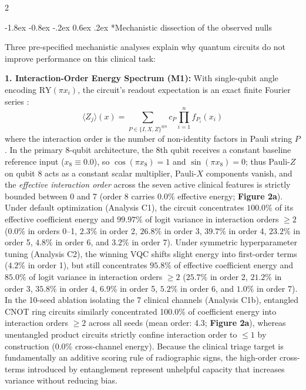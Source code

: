 \documentclass[10pt,a4paper,twoside]{article}
\makeatletter
\renewcommand{\subsection}{\@startsection{subsection}{2}{\z@}%
  {-1.8ex \@plus -0.8ex \@minus -.2ex}%
  {0.6ex \@plus.2ex}%
  {\normalfont\normalsize\sffamily\bfseries\color{naturedark}}}
\makeatother
\begin{document}
\begin{multicols}{2}

\subsection*{Mechanistic dissection of the observed nulls}

Three pre-specified mechanistic analyses explain why quantum circuits do not improve performance on this clinical task:

\textbf{1. Interaction-Order Energy Spectrum (M1):} With single-qubit angle encoding $\text{RY}(\pi x_i)$, the circuit's readout expectation is an exact finite Fourier series \cite{schuld2021effect}:
\begin{equation}
\langle Z_j \rangle(x) = \sum_{P \in \{I, X, Z\}^{\otimes n}} c_P \prod_{i=1}^n f_{P_i}(x_i)
\end{equation}
where the interaction order is the number of non-identity factors in Pauli string $P$. In the primary 8-qubit architecture, the 8th qubit receives a constant baseline reference input ($x_8 \equiv 0.0$), so $\cos(\pi x_8) = 1$ and $\sin(\pi x_8) = 0$; thus Pauli-$Z$ on qubit 8 acts as a constant scalar multiplier, Pauli-$X$ components vanish, and the \textit{effective interaction order} across the seven active clinical features is strictly bounded between 0 and 7 (order 8 carries $0.0\%$ effective energy; \textbf{Figure 2a}). Under default optimization (Analysis C1), the circuit concentrates $100.0\%$ of its effective coefficient energy and $99.97\%$ of logit variance in interaction orders $\ge 2$ ($0.0\%$ in orders 0--1, $2.3\%$ in order 2, $26.8\%$ in order 3, $39.7\%$ in order 4, $23.2\%$ in order 5, $4.8\%$ in order 6, and $3.2\%$ in order 7). Under symmetric hyperparameter tuning (Analysis C2), the winning VQC shifts slight energy into first-order terms ($4.2\%$ in order 1), but still concentrates $95.8\%$ of effective coefficient energy and $85.0\%$ of logit variance in interaction orders $\ge 2$ ($25.7\%$ in order 2, $21.2\%$ in order 3, $35.8\%$ in order 4, $6.9\%$ in order 5, $5.2\%$ in order 6, and $1.0\%$ in order 7). In the 10-seed ablation isolating the 7 clinical channels (Analysis C1b), entangled CNOT ring circuits similarly concentrated 100.0\% of coefficient energy into interaction orders $\ge 2$ across all seeds (mean order: 4.3; \textbf{Figure 2a}), whereas unentangled product circuits strictly confine interaction order to $\le 1$ by construction (0.0\% cross-channel energy). Because the clinical triage target is fundamentally an additive scoring rule of radiographic signs, the high-order cross-terms introduced by entanglement represent unhelpful capacity that increases variance without reducing bias.


\end{multicols}
\end{document}
